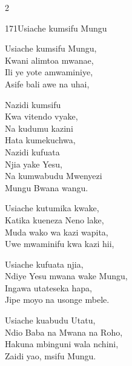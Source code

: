 \begin{multicols}{2}
\begin{hymn}{171}{Usiache kumsifu Mungu}{}
\begin{stanza}
Usiache kumsifu Mungu,\\
Kwani alimtoa mwanae,\\
Ili ye yote amwaminiye,\\
Asife bali awe na uhai,
\end{stanza}
\begin{chorus}
Nazidi kumsifu\\
Kwa vitendo vyake,\\
Na kudumu kazini\\
Hata kumekuchwa,\\
Nazidi kufuata\\
Njia yake Yesu,\\
Na kumwabudu Mwenyezi\\
Mungu Bwana wangu.
\end{chorus}
\begin{stanza}
Usiache kutumika kwake,\\
Katika kueneza Neno lake,\\
Muda wako wa kazi wapita,\\
Uwe mwaminifu kwa kazi hii,
\end{stanza}
\begin{stanza}
Usiache kufuata njia,\\
Ndiye Yesu mwana wake Mungu,\\
Ingawa utateseka hapa,\\
Jipe moyo na usonge mbele.
\end{stanza}
\begin{stanza}
Usiache kuabudu Utatu,\\
Ndio Baba na Mwana na Roho,\\
Hakuna mbinguni wala nchini,\\
Zaidi yao, msifu Mungu.
\end{stanza}
\end{hymn}


\end{multicols}
